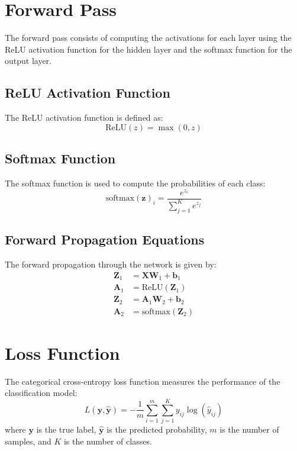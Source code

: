 \documentclass{article}
\begin{document}
\section{Forward Pass}
The forward pass consists of computing the activations for each layer using the ReLU activation function for the hidden layer and the softmax function for the output layer.

\subsection{ReLU Activation Function}
The ReLU activation function is defined as:
\begin{equation}
\text{ReLU}(z) = \max(0, z)
\end{equation}

\subsection{Softmax Function}
The softmax function is used to compute the probabilities of each class:
\begin{equation}
\text{softmax}(\mathbf{z})_i = \frac{e^{z_i}}{\sum_{j=1}^K e^{z_j}}
\end{equation}

\subsection{Forward Propagation Equations}
The forward propagation through the network is given by:
\begin{align}
\mathbf{Z}_1 &= \mathbf{X} \mathbf{W}_1 + \mathbf{b}_1 \\
\mathbf{A}_1 &= \text{ReLU}(\mathbf{Z}_1) \\
\mathbf{Z}_2 &= \mathbf{A}_1 \mathbf{W}_2 + \mathbf{b}_2 \\
\mathbf{A}_2 &= \text{softmax}(\mathbf{Z}_2)
\end{align}

\section{Loss Function}
The categorical cross-entropy loss function measures the performance of the classification model:
\begin{equation}
L(\mathbf{y}, \hat{\mathbf{y}}) = -\frac{1}{m} \sum_{i=1}^m \sum_{j=1}^K y_{ij} \log(\hat{y}_{ij})
\end{equation}
where \( \mathbf{y} \) is the true label, \( \hat{\mathbf{y}} \) is the predicted probability, \( m \) is the number of samples, and \( K \) is the number of classes.
\end{document}
